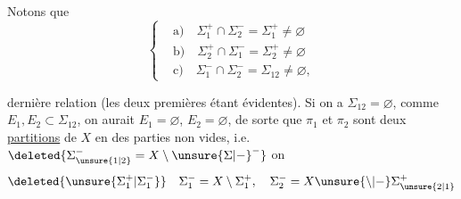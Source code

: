 Notons que
\[
\left\{\begin{aligned}
&\text{a)}\quad\Sigma_1^+\cap\Sigma_2^-=\Sigma_1^+\ne\varnothing\\
&\text{b)}\quad\Sigma_2^+\cap\Sigma_1^-=\Sigma_2^+\ne\varnothing\\
&\text{c)}\quad\Sigma_1^-\cap\Sigma_2^-=\Sigma_{12}\ne\varnothing,
\end{aligned}\right.\tag*{(16)}
\]

  dernière relation (les deux premières étant évidentes).
Si on a $\Sigma_{12}=\varnothing$, comme $E_1,E_2\subset\Sigma_{12}$, on aurait $E_1=\varnothing$, $E_2=\varnothing$, de sorte que $\pi_1$ et $\pi_2$ sont deux \uline{partitions} de $X$ en des parties non vides, i.e. $\deleted{\Sigma_{\unsure{1|2}}^- = X\setminus{\unsure{\Sigma|{-}}}^-}$ on 
\[
\deleted{\unsure{\Sigma_1^+|\Sigma_1^-}}\quad\Sigma_1^-=X\setminus\Sigma_1^+,\quad\Sigma_2^-=X\unsure{\setminus|-}\Sigma_{\unsure{2|1}}^+
\]
\endgroup
